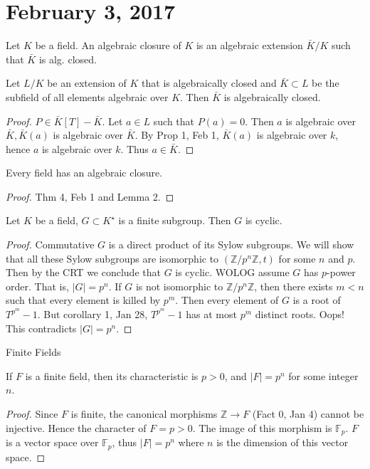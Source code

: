 \section{February 3, 2017}

\begin{defn}
\hspace{0.5cm}
Let $K$ be a field. An algebraic closure of $K$ is an algebraic extension $\bar{K}/K$ such that $\bar{K}$ is alg. closed.
\end{defn}
\begin{lemma}
Let $L/K$ be an extension of $K$ that is algebraically closed and $\bar{K}\subset L$ be the subfield of all elements algebraic over $K$. Then $\bar{K}$ is algebraically closed.
\end{lemma}
\begin{proof}
$P\in \bar{K}[T]-\bar{K}.$ Let $a\in L$ such that $P(a)=0$. Then $a$ is algebraic over $\bar{K},\bar{K}(a)$ is algebraic over $\bar{K}$. By Prop 1, Feb 1, $\bar{K}(a)$ is algebraic over $k$, hence $a$ is algebraic over $k$. Thus $a\in\bar{K}$.
\end{proof}
\begin{cor}
Every field has an algebraic closure.
\end{cor}
\begin{proof}
Thm 4, Feb 1 and Lemma 2.
\end{proof}
\begin{prop}
Let $K$ be a field, $G\subset K^{\star}$ is a finite subgroup. Then $G$ is cyclic.
\end{prop}
\begin{proof}
Commutative $G$ is a direct product of its Sylow subgroups. We will show that all these Sylow subgroups are isomorphic to $(\mathbb{Z}/p^n\mathbb{Z},t)$ for some $n$ and $p$. Then by the CRT we conclude that $G$ is cyclic. WOLOG assume $G$ has $p$-power order. That is, $|G|=p^n$. If $G$ is not isomorphic to $\mathbb{Z}/p^n\mathbb{Z}$, then there exists $m<n$ such that every element is killed by $p^m$. Then every element of $G$ is a root of $T^{p^m}-1$. But corollary 1, Jan 28, $T^{p^m}-1$ has at most $p^m$ distinct roots. Oops! This contradicts $|G|=p^n$.
\end{proof}
Finite Fields
\begin{fact}
If $F$ is a finite field, then its characteristic is $p>0$, and $|F|=p^n$ for some integer $n$. 
\end{fact}
\begin{proof}
Since $F$ is finite, the canonical morphisms $\mathbb{Z}\longrightarrow F$ (Fact 0, Jan 4) cannot be injective. Hence the character of $F=p>0$. The image of this morphism is $\mathbb{F}_p$. $F$ is a vector space over $\mathbb{F}_p$, thus $|F|=p^n$ where $n$ is the dimension of this vector space.
\end{proof}
